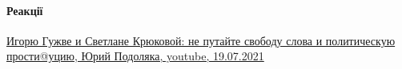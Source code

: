  
 
 
 
 
\paragraph{Реакції}

\href{https://www.youtube.com/watch?v=gLKuHECGVM8}{%
Игорю Гужве и Светлане Крюковой: не путайте свободу слова и политическую прости@уцию,%
Юрий Подоляка, youtube, 19.07.2021%
}
